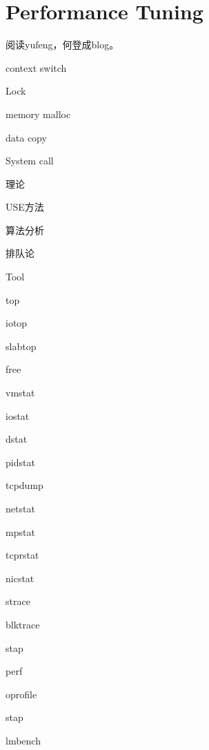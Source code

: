 \chapter{Performance Tuning}

阅读yufeng，何登成blog。

\begin{enumbox}
\item context switch 
\item Lock 
\item memory malloc
\item data copy
\item System call 
\end{enumbox}

理论
\begin{enumbox}
\item USE方法
\item 算法分析
\item 排队论
\end{enumbox}

Tool
\begin{enumbox}
\item top
\item iotop
\item slabtop
\item free
\item vmstat
\item iostat
\item dstat
\item pidstat
\item *
\item tcpdump
\item netstat
\item mpstat
\item tcprstat
\item nicstat
\item *
\item strace
\item blktrace
\item stap
\item perf
\item oprofile
\item stap
\item lmbench
\end{enumbox}
